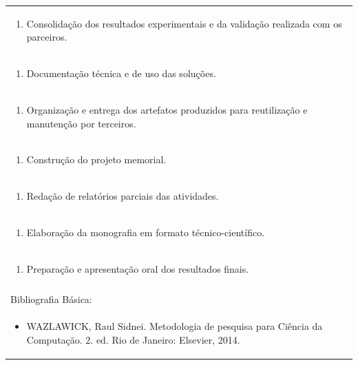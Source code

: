\documentclass[11pt]{article}
\begin{document}
\begin{center}
\begin{longtable}{|p{4cm}|p{4cm}|p{4cm}|p{4cm}|}
\multicolumn{4}{|p{\dimexpr 16cm + 6\tabcolsep\relax}|}{\begin{enumerate}[start=2]\item Consolidação dos resultados experimentais e da validação realizada com os parceiros.\end{enumerate}}\\
\multicolumn{4}{|p{\dimexpr 16cm + 6\tabcolsep\relax}|}{\begin{enumerate}[start=3]\item Documentação técnica e de uso das soluções.\end{enumerate}}\\
\multicolumn{4}{|p{\dimexpr 16cm + 6\tabcolsep\relax}|}{\begin{enumerate}[start=4]\item Organização e entrega dos artefatos produzidos para reutilização e manutenção por terceiros.\end{enumerate}}\\
\multicolumn{4}{|p{\dimexpr 16cm + 6\tabcolsep\relax}|}{\begin{enumerate}[start=5]\item Construção do projeto memorial.\end{enumerate}}\\
\multicolumn{4}{|p{\dimexpr 16cm + 6\tabcolsep\relax}|}{\begin{enumerate}[start=6]\item Redação de relatórios parciais das atividades.\end{enumerate}}\\
\multicolumn{4}{|p{\dimexpr 16cm + 6\tabcolsep\relax}|}{\begin{enumerate}[start=7]\item Elaboração da monografia em formato técnico-científico.\end{enumerate}}\\
\multicolumn{4}{|p{\dimexpr 16cm + 6\tabcolsep\relax}|}{\begin{enumerate}[start=8]\item Preparação e apresentação oral dos resultados finais.\end{enumerate}}\\
\multicolumn{4}{|p{\dimexpr 16cm + 6\tabcolsep\relax}|}{}\\
\hline
\multicolumn{4}{|p{16cm}|}{Bibliografia Básica:}\\*
\multicolumn{4}{|p{\dimexpr 16cm + 6\tabcolsep\relax}|}{\begin{itemize}\item WAZLAWICK, Raul Sidnei. Metodologia de pesquisa para Ciência da Computação. 2. ed. Rio de Janeiro: Elsevier, 2014.\end{itemize}}\\

\end{longtable}
\end{center}
\end{document}
